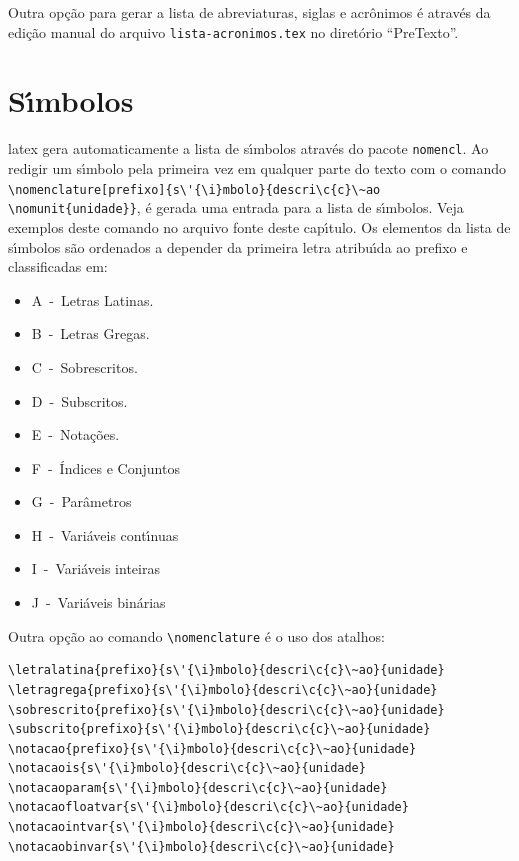 Outra op\c{c}\~ao para gerar a lista de abreviaturas, siglas e acr\^onimos \'e atrav\'es da edi\c{c}\~ao manual do arquivo \texttt{lista-acronimos.tex} no diret\'orio ``PreTexto''.

\section{S\'{\i}mbolos}\label{sec:simbolos}

\gls{latex} gera automaticamente a lista de s\'{\i}mbolos atrav\'es do pacote \texttt{nomencl}. Ao redigir um s\'{\i}mbolo pela primeira vez em qualquer parte do texto com o comando \verb|\nomenclature[prefixo]{s\'{\i}mbolo}{descri\c{c}\~ao \nomunit{unidade}}|, \'e gerada uma entrada para a lista de s\'{\i}mbolos. Veja exemplos deste comando no arquivo fonte deste cap\'{\i}tulo. Os elementos da lista de s\'{\i}mbolos s\~ao ordenados a depender da primeira letra atribu\'{\i}da ao prefixo e classificadas em:

\begin{itemize}%
\item A~-~Letras Latinas.
\item B~-~Letras Gregas.
\item C~-~Sobrescritos.
\item D~-~Subscritos.
\item E~-~Nota\c{c}\~oes.
\item F~-~\'Indices e Conjuntos
\item G~-~Par\^ametros
\item H~-~Vari\'aveis cont\'{\i}nuas
\item I~-~Vari\'aveis inteiras
\item J~-~Vari\'aveis bin\'arias
\end{itemize}

Outra op\c{c}\~ao ao comando \verb|\nomenclature| \'e o uso dos atalhos:

\begin{SingleSpacing}%
\begin{verbatim}
\letralatina{prefixo}{s\'{\i}mbolo}{descri\c{c}\~ao}{unidade}
\letragrega{prefixo}{s\'{\i}mbolo}{descri\c{c}\~ao}{unidade}
\sobrescrito{prefixo}{s\'{\i}mbolo}{descri\c{c}\~ao}{unidade}
\subscrito{prefixo}{s\'{\i}mbolo}{descri\c{c}\~ao}{unidade}
\notacao{prefixo}{s\'{\i}mbolo}{descri\c{c}\~ao}{unidade}
\notacaois{s\'{\i}mbolo}{descri\c{c}\~ao}{unidade}
\notacaoparam{s\'{\i}mbolo}{descri\c{c}\~ao}{unidade}
\notacaofloatvar{s\'{\i}mbolo}{descri\c{c}\~ao}{unidade}
\notacaointvar{s\'{\i}mbolo}{descri\c{c}\~ao}{unidade}
\notacaobinvar{s\'{\i}mbolo}{descri\c{c}\~ao}{unidade}
\end{verbatim}
\end{SingleSpacing}

